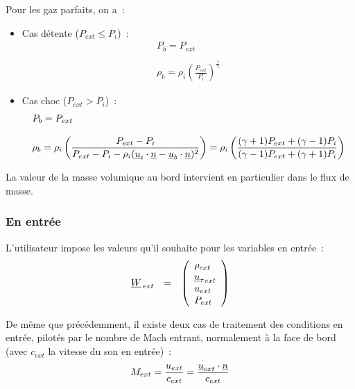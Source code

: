 \begin{enumerate}
\bigskip
Pour les gaz parfaits, on a~:
\begin{itemize}

\item Cas détente ($P_{ext} \leqslant P_i$)~:\\
$$
\begin{array}{l}
P_b=P_{ext}\\
\\
\rho_b=\rho_i \left(\displaystyle\frac{P_{ext}}{P_i}\right)^{\frac{1}{\gamma}}
\end{array}
$$

\item Cas choc ($P_{ext} > P_i$)~:\\
$$
\begin{array}{l}
P_b=P_{ext}\\
\\
\rho_b=\rho_i \left(\displaystyle\frac{P_{ext}-P_i}{P_{ext}-P_i-\rho_i
(\underline{u}_i \cdot \underline{n} - \underline{u}_b \cdot \underline{n})^2}\right)
= \rho_i \left(\displaystyle\frac{(\gamma+1)P_{ext}+(\gamma-1)P_i}
{(\gamma-1)P_{ext}+(\gamma+1)P_i}\right)\\
\end{array}
$$

\end{itemize}

\end{enumerate}

La valeur de la masse volumique au bord intervient en particulier
dans le flux de masse.


\subsubsection*{En entrée}

L'utilisateur impose les valeurs qu'il souhaite pour les variables
en entrée~:
$$
\begin{array}{lllll}
\underline{W}_{\,ext} &=&
\left(\begin{array}{l}
\rho_{ext}\\ {\underline{u}_\tau}_{ext}\\ u_{ext}\\ P_{ext}
\end{array}\right)
\end{array}
$$

De même que précédemment, il existe deux cas de traitement
des conditions en entrée,
pilotés par le nombre de Mach entrant, normalement à la face de bord
(avec $c_{ext}$ la vitesse du son en entrée)~:
$$M_{ext} = \displaystyle\frac{u_{ext}}{c_{ext}}
= \displaystyle\frac{\underline{u}_{ext} \cdot \underline{n}}{c_{ext}}$$

